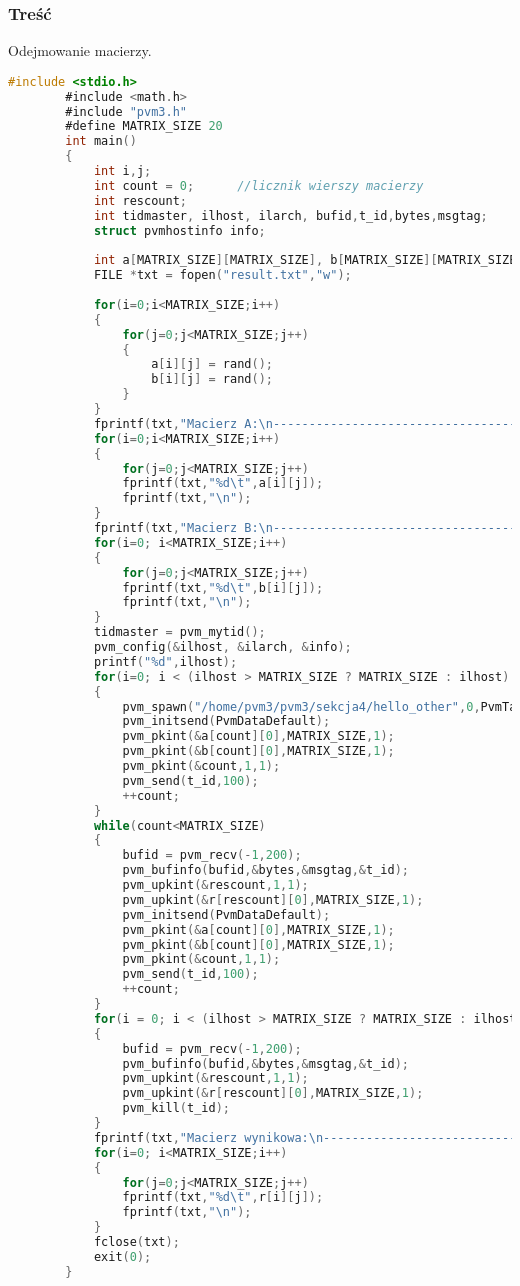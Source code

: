 		\subsubsection{Treść}
		Odejmowanie macierzy.
		\begin{lstlisting}[language=C]
		#include <stdio.h>
		#include <math.h>
		#include "pvm3.h"
		#define MATRIX_SIZE 20
		int main() 
		{
			int i,j;
			int count = 0; 		//licznik wierszy macierzy
			int rescount;
			int tidmaster, ilhost, ilarch, bufid,t_id,bytes,msgtag;
			struct pvmhostinfo info;
			
			int a[MATRIX_SIZE][MATRIX_SIZE], b[MATRIX_SIZE][MATRIX_SIZE], r[MATRIX_SIZE][MATRIX_SIZE];
			FILE *txt = fopen("result.txt","w");
			
			for(i=0;i<MATRIX_SIZE;i++)
			{
				for(j=0;j<MATRIX_SIZE;j++)
				{
					a[i][j] = rand();
					b[i][j] = rand();
				}
			}
			fprintf(txt,"Macierz A:\n--------------------------------------------------\n\n");
			for(i=0;i<MATRIX_SIZE;i++)
			{
				for(j=0;j<MATRIX_SIZE;j++)
				fprintf(txt,"%d\t",a[i][j]);
				fprintf(txt,"\n");
			}
			fprintf(txt,"Macierz B:\n--------------------------------------------------\n\n");
			for(i=0; i<MATRIX_SIZE;i++)
			{
				for(j=0;j<MATRIX_SIZE;j++)
				fprintf(txt,"%d\t",b[i][j]);
				fprintf(txt,"\n");
			}
			tidmaster = pvm_mytid();
			pvm_config(&ilhost, &ilarch, &info);
			printf("%d",ilhost);
			for(i=0; i < (ilhost > MATRIX_SIZE ? MATRIX_SIZE : ilhost) ;i++)
			{
				pvm_spawn("/home/pvm3/pvm3/sekcja4/hello_other",0,PvmTaskHost,info[i].hi_name,1,&t_id);
				pvm_initsend(PvmDataDefault);
				pvm_pkint(&a[count][0],MATRIX_SIZE,1);
				pvm_pkint(&b[count][0],MATRIX_SIZE,1);
				pvm_pkint(&count,1,1);
				pvm_send(t_id,100);	
				++count;
			}
			while(count<MATRIX_SIZE)
			{
				bufid = pvm_recv(-1,200);
				pvm_bufinfo(bufid,&bytes,&msgtag,&t_id);
				pvm_upkint(&rescount,1,1);
				pvm_upkint(&r[rescount][0],MATRIX_SIZE,1);
				pvm_initsend(PvmDataDefault);
				pvm_pkint(&a[count][0],MATRIX_SIZE,1);
				pvm_pkint(&b[count][0],MATRIX_SIZE,1);
				pvm_pkint(&count,1,1);
				pvm_send(t_id,100);
				++count;
			}
			for(i = 0; i < (ilhost > MATRIX_SIZE ? MATRIX_SIZE : ilhost); i++)
			{
				bufid = pvm_recv(-1,200);
				pvm_bufinfo(bufid,&bytes,&msgtag,&t_id);
				pvm_upkint(&rescount,1,1);
				pvm_upkint(&r[rescount][0],MATRIX_SIZE,1);
				pvm_kill(t_id);	
			}
			fprintf(txt,"Macierz wynikowa:\n--------------------------------------------------\n\n");
			for(i=0; i<MATRIX_SIZE;i++)
			{
				for(j=0;j<MATRIX_SIZE;j++)
				fprintf(txt,"%d\t",r[i][j]);
				fprintf(txt,"\n");
			}
			fclose(txt);
			exit(0);
		}
		\end{lstlisting}
